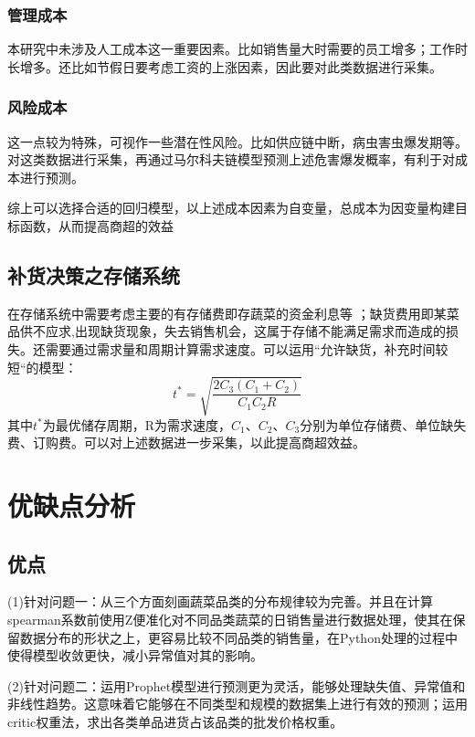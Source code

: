 \documentclass[withoutpreface,bwprint]{cumcmthesis} %
\begin{document}
\subsubsection{管理成本}
本研究中未涉及人工成本这一重要因素。比如销售量大时需要的员工增多；工作时长增多。还比如节假日要考虑工资的上涨因素，因此要对此类数据进行采集。

\subsubsection{风险成本}
这一点较为特殊，可视作一些潜在性风险。比如供应链中断，病虫害虫爆发期等。对这类数据进行采集，再通过马尔科夫链模型预测上述危害爆发概率，有利于对成本进行预测。

综上可以选择合适的回归模型，以上述成本因素为自变量，总成本为因变量构建目标函数，从而提高商超的效益
\subsection{补货决策之存储系统}
在存储系统中需要考虑主要的有存储费即存蔬菜的资金利息等 ；缺货费用即某菜品供不应求,出现缺货现象，失去销售机会，这属于存储不能满足需求而造成的损失\cite{商品存储优化问题的研究及系统实现}。还需要通过需求量和周期计算需求速度。可以运用“允许缺货，补充时间较短“的模型：
\begin{equation}
 t^{*}=\sqrt{\frac{2 C_{3}\left(C_{1}+C_{2}\right)}{C_{1} C_{2} R}}   
\end{equation}
其中$ t^{*}$为最优储存周期，R为需求速度，$C_{1}$、$C_{2}$、$C_{3}$分别为单位存储费、单位缺失费、订购费。可以对上述数据进一步采集，以此提高商超效益。





\section{优缺点分析}

\subsection{优点}

(1)针对问题一：从三个方面刻画蔬菜品类的分布规律较为完善。并且在计算spearman系数前使用Z便准化对不同品类蔬菜的日销售量进行数据处理，使其在保留数据分布的形状之上，更容易比较不同品类的销售量，在Python处理的过程中使得模型收敛更快，减小异常值对其的影响。


(2)针对问题二：运用Prophet模型进行预测更为灵活，能够处理缺失值、异常值和非线性趋势。这意味着它能够在不同类型和规模的数据集上进行有效的预测；运用critic权重法，求出各类单品进货占该品类的批发价格权重。
\end{document}
